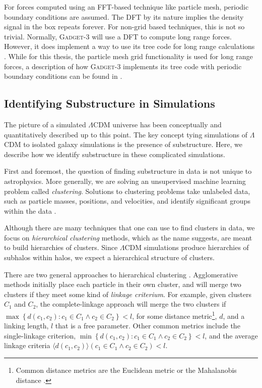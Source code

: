 For forces computed using an FFT-based technique like particle mesh, periodic boundary conditions are assumed. The DFT by its nature implies the density signal in the box repeats forever. For non-grid based techniques, this is not so trivial. Normally, \textsc{Gadget-3} will use a DFT to compute long range forces. However, it does implement a way to use its tree code for long range calculations \citep{GadgetCodePaper}. While for this thesis, the particle mesh grid functionality is used for long range forces, a description of how \textsc{Gadget-3} implements its tree code with periodic boundary conditions can be found in \citet{hernquist_1991}.

\subsection{Identifying Substructure in Simulations}


The picture of a simulated $\Lambda$CDM universe has been conceptually and quantitatively described up to this point. The key concept tying simulations of $\Lambda$CDM to isolated galaxy simulations is the presence of substructure. Here, we describe how we identify substructure in these complicated simulations. 

First and foremost, the question of finding substructure in data is not unique to astrophysics. More generally, we are solving an unsupervised machine learning problem called \textit{clustering}. Solutions to clustering problems take unlabeled data, such as particle masses, positions, and velocities, and identify significant groups within the data \citep{statistical_learning_r}. 

Although there are many techniques that one can use to find clusters in data, we focus on \textit{hierarchical clustering} methods, which as the name suggests, are meant to build hierarchies of clusters. Since $\Lambda$CDM simulations produce hierarchies of subhalos within halos, we expect a hierarchical structure of clusters.

There are two general approaches to hierarchical clustering \citep{statistical_learning_r}. Agglomerative methods initially place each particle in their own cluster, and will merge two clusters if they meet some kind of \textit{linkage criterium}. For example, given clusters $C_1$ and $C_2$, the complete-linkage approach will merge the two clusters if $\max\left\{ d(c_1, c_2) : c_1 \in C_1 \wedge c_2 \in C_2\right\} < l$, for some distance metric\footnote{Common distance metrics are the Euclidean metric or the Mahalanobis distance \citep{statistical_learning_r}.}, $d$,  and a linking length, $l$ that is a free parameter. Other common metrics include the single-linkage criterion, $\min\left\{ d(c_1, c_2) : c_1 \in C_1 \wedge c_2 \in C_2\right\} < l$, and the average linkage criteria $\langle d(c_1,c_2) \rangle \left (c_1 \in C_1 \wedge c_2 \in C_2\right) < l$.

